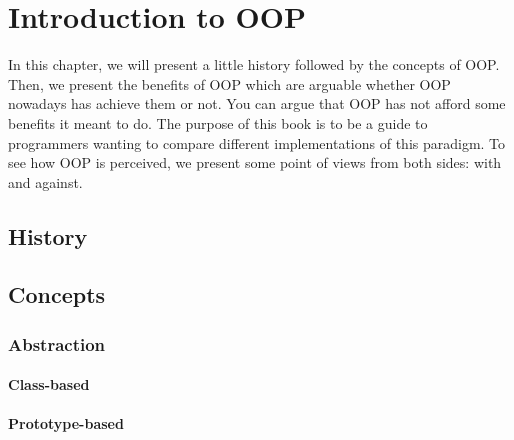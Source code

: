 \documentclass[12pt]{book}
\begin{document}
		\chapter{Introduction to OOP}
\fi

\begin{introduction}
	In this chapter, we will present a little history followed by the concepts of OOP.
	Then, we present the benefits of OOP which are arguable whether OOP nowadays has achieve them or not. 
	You can argue that OOP has not afford some benefits it meant to do. 
	The purpose of this book is to be a guide to programmers wanting to compare different implementations of this paradigm. 
	To see how OOP is perceived, we present some point of views from both sides: with and against.
\end{introduction}

\section{History}



\section{Concepts}

\subsection{Abstraction}


\subsubsection{Class-based}

\subsubsection{Prototype-based}

\end{document}
